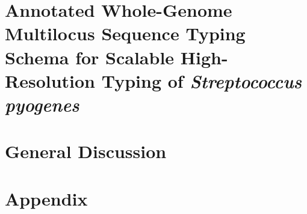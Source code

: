 \documentclass[12pt,a4paper,twoside,openright]{book}
\makeatletter
\def\cleardoublepage{\clearpage\if@twoside \ifodd\c@page\else
    \hbox{}
    \thispagestyle{plain}
    \newpage
    \if@twocolumn\hbox{}\newpage\fi\fi\fi}
\makeatother
\begin{document}
\begin{sloppy}
\newpage
\thispagestyle{empty}
\chapter{Annotated Whole-Genome Multilocus Sequence Typing Schema for Scalable High-Resolution Typing of \textit{Streptococcus pyogenes}\label{ch:paper3}}
\thispagestyle{empty}
\cleardoublepage


\newpage
\thispagestyle{empty}
\chapter{General Discussion \label{ch:discussion}}
\thispagestyle{empty}
\cleardoublepage


\cleardoublepage
{}
{}
\printbibliography

\newpage
\chapter*{Appendix}
\cleardoublepage



\end{sloppy}
\end{document}

